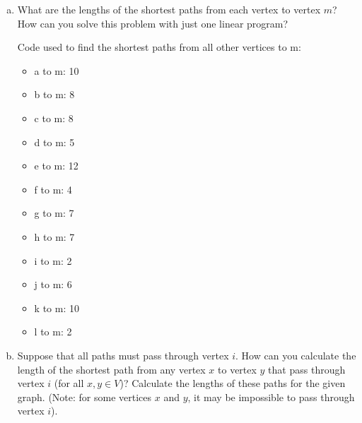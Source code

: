 \documentclass[../report/main.tex]{subfiles}
\begin{document}
\begin{enumerate}[a)]
	\item What are the lengths of the shortest paths from each vertex to vertex $m$? How can you solve this problem with just one linear program?

    Code used to find the shortest paths from all other vertices to m:

    

    \begin{itemize}
        \item a to m: 10
        \item b to m: 8
        \item c to m: 8
        \item d to m: 5
        \item e to m: 12
        \item f to m: 4
        \item g to m: 7
        \item h to m: 7
        \item i to m: 2
        \item j to m: 6
        \item k to m: 10
        \item l to m: 2
    \end{itemize}

	\item Suppose that all paths must pass through vertex $i$. How can you calculate the length of the shortest path from any vertex $x$ to vertex $y$ that pass through vertex $i$ (for all $x, y \in V$)? Calculate the lengths of these paths for the given graph. (Note: for some vertices $x$ and $y$, it may be impossible to pass through vertex $i$).
\end{enumerate}
\end{document}
